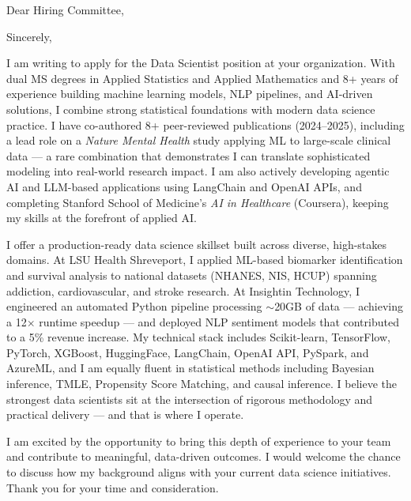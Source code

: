 \documentclass[11pt,a4paper,roman]{moderncv}
\begin{document}
\opening{Dear Hiring Committee,}
\closing{Sincerely,}
\makelettertitle

I am writing to apply for the Data Scientist position at your organization. With dual MS degrees in Applied Statistics and Applied Mathematics and 8+ years of experience building machine learning models, NLP pipelines, and AI-driven solutions, I combine strong statistical foundations with modern data science practice. I have co-authored 8+ peer-reviewed publications (2024--2025), including a lead role on a \textit{Nature Mental Health} study applying ML to large-scale clinical data --- a rare combination that demonstrates I can translate sophisticated modeling into real-world research impact. I am also actively developing agentic AI and LLM-based applications using LangChain and OpenAI APIs, and completing Stanford School of Medicine's \textit{AI in Healthcare} (Coursera), keeping my skills at the forefront of applied AI.

I offer a production-ready data science skillset built across diverse, high-stakes domains. At LSU Health Shreveport, I applied ML-based biomarker identification and survival analysis to national datasets (NHANES, NIS, HCUP) spanning addiction, cardiovascular, and stroke research. At Insightin Technology, I engineered an automated Python pipeline processing $\sim$20GB of data --- achieving a 12$\times$ runtime speedup --- and deployed NLP sentiment models that contributed to a 5\% revenue increase. My technical stack includes Scikit-learn, TensorFlow, PyTorch, XGBoost, HuggingFace, LangChain, OpenAI API, PySpark, and AzureML, and I am equally fluent in statistical methods including Bayesian inference, TMLE, Propensity Score Matching, and causal inference. I believe the strongest data scientists sit at the intersection of rigorous methodology and practical delivery --- and that is where I operate.

I am excited by the opportunity to bring this depth of experience to your team and contribute to meaningful, data-driven outcomes. I would welcome the chance to discuss how my background aligns with your current data science initiatives. Thank you for your time and consideration.

\vspace{0.5cm}

\makeletterclosing
\end{document}
